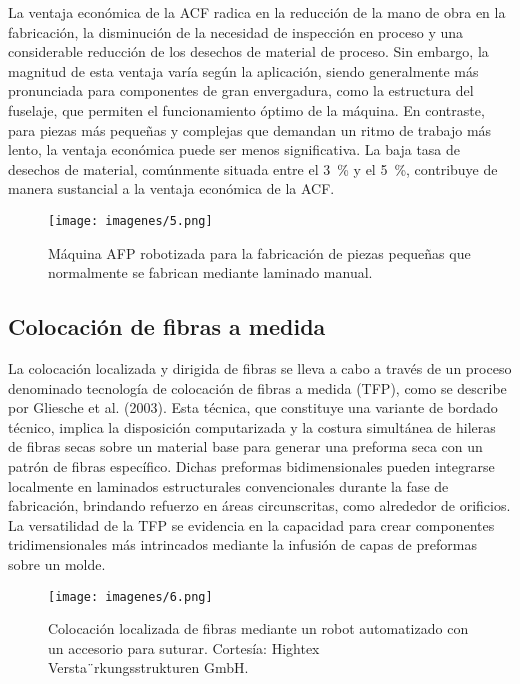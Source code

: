 \begin{enumerate}[label=\arabic*.]
La ventaja económica de la ACF radica en la reducción de la mano de obra en la fabricación, la disminución de la necesidad de inspección en proceso y una considerable reducción de los desechos de material de proceso. Sin embargo, la magnitud de esta ventaja varía según la aplicación, siendo generalmente más pronunciada para componentes de gran envergadura, como la estructura del fuselaje, que permiten el funcionamiento óptimo de la máquina. En contraste, para piezas más pequeñas y complejas que demandan un ritmo de trabajo más lento, la ventaja económica puede ser menos significativa. La baja tasa de desechos de material, comúnmente situada entre el 3 \% y el 5 \%, contribuye de manera sustancial a la ventaja económica de la ACF.


\begin{figure}[h]
    \centering
    \texttt{[image: imagenes/5.png]}
    \caption{Máquina AFP robotizada para la fabricación de piezas pequeñas que normalmente se fabrican mediante laminado manual.}
    \label{fig:enter-label}
\end{figure}



\subsection{Colocación de fibras a medida}
La colocación localizada y dirigida de fibras se lleva a cabo a través de un proceso denominado tecnología de colocación de fibras a medida (TFP), como se describe por Gliesche et al. (2003). Esta técnica, que constituye una variante de bordado técnico, implica la disposición computarizada y la costura simultánea de hileras de fibras secas sobre un material base para generar una preforma seca con un patrón de fibras específico. Dichas preformas bidimensionales pueden integrarse localmente en laminados estructurales convencionales durante la fase de fabricación, brindando refuerzo en áreas circunscritas, como alrededor de orificios. La versatilidad de la TFP se evidencia en la capacidad para crear componentes tridimensionales más intrincados mediante la infusión de capas de preformas sobre un molde.
\begin{figure}[h]
    \centering
    \texttt{[image: imagenes/6.png]}
    \caption{Colocación localizada de fibras mediante un robot automatizado con un accesorio para suturar.
Cortesía: Hightex Versta¨rkungsstrukturen GmbH.}
    \label{fig:enter-label}
\end{figure}


\end{enumerate}
